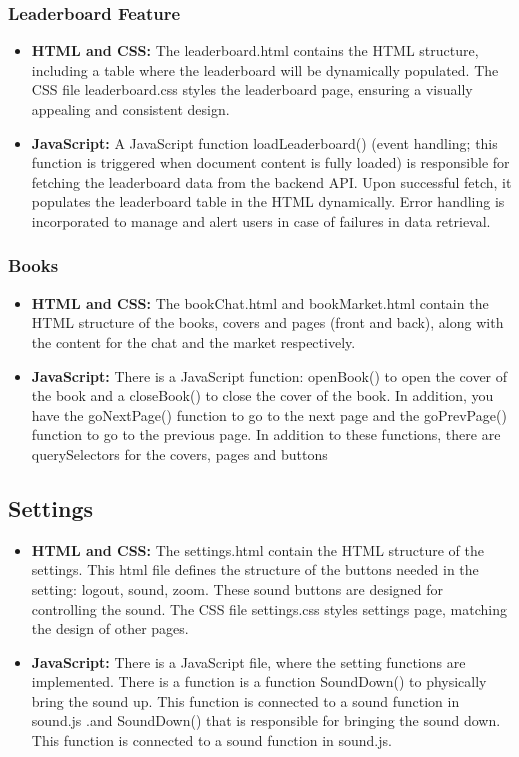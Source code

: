 \documentclass[12pt]{article}
\begin{document}
\subsubsection{Leaderboard Feature}
\begin{itemize}
    \item \textbf{HTML and CSS:} The leaderboard.html contains the HTML structure, including a table where the leaderboard will be dynamically populated. The CSS file leaderboard.css styles the leaderboard page, ensuring a visually appealing and consistent design.
    \item \textbf{JavaScript:} A JavaScript function loadLeaderboard() (event handling; this function is triggered when document content is fully loaded) is responsible for fetching the leaderboard data from the backend API. Upon successful fetch, it populates the leaderboard table in the HTML dynamically. Error handling is incorporated to manage and alert users in case of failures in data retrieval.
\end{itemize}

\subsubsection{Books}
\begin{itemize}
    \item \textbf{HTML and CSS:} The bookChat.html and bookMarket.html contain the HTML structure of the books, covers and pages (front and back), along with the content for the chat and the market respectively.
    \item \textbf{JavaScript:} There is a JavaScript function: openBook() to open the cover of the book and a closeBook() to close the cover of the book. In addition, you have the goNextPage() function to go to the next page and the goPrevPage() function to go to the previous page. In addition to these functions, there are querySelectors for the covers, pages and buttons
\end{itemize}

\subsection{Settings}
\begin{itemize}
    \item \textbf{HTML and CSS:} The settings.html contain the HTML structure of the settings. This html file defines the structure of the buttons needed in the setting: logout, sound, zoom.  These sound buttons are designed for controlling the sound. The CSS file settings.css styles settings page, matching the design of other pages.
    \item \textbf{JavaScript:} There is a JavaScript file, where the setting functions are implemented. There is a function is a function SoundDown() to physically bring the sound up. This function is connected to a sound function in sound.js .and SoundDown() that is responsible for bringing the sound down. This function is connected to a sound function in sound.js.
\end{itemize}
\end{document}
